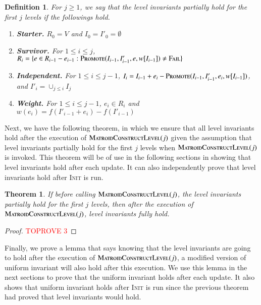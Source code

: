 \documentclass[11pt]{article}
\newtheorem{theorem}{Theorem}
\newtheorem{definition}{Definition}[section]
\newcommand{\err}{{\textsc{Fail}}}
\newcommand{\init}{\textsc{Init}}
\newcommand{\MatroidConstLevel}{\textsc{MatroidConstructLevel}}
\newcommand{\replacementTester}{\textsc{Promote}}
\begin{document}
\begin{tcolorbox}[width=\linewidth, colback=white!80!gray,boxrule=0pt,frame hidden, sharp corners]

\begin{definition}
    For $j \ge 1$, we say that 
    \emph{the level invariants partially hold for the first $j$ levels} if the followings hold.
    \begin{enumerate}
        \item \textbf{Starter.} $R_0 = V$ and $I_0 = I'_0 = \emptyset$
        \item \textbf{Survivor.}  For $1 \leq i \le j$, $R_i = \{ e \in R_{i-1} - e_{i-1}: \replacementTester{}(I_{i-1}, I'_{i-1}, e, w[I_{i-1}]) \ne \err\}$ 
        \item  \textbf{Independent.} For $1 \leq i \le j-1$, $I_i = I_{i-1} + e_i - \replacementTester{}(I_{i-1}, I'_{i-1}, e_i, w[I_{i-1}])$, and $I'_i = \cup_{j \le i} I_j$
        \item  \textbf{Weight.} For $1 \leq i \le j - 1$, $e_i \in R_i$ and  $w(e_i) = f(I'_{i-1} + e_i) - f(I'_{i-1})$
    \end{enumerate}
\end{definition}

\end{tcolorbox}


Next, we have the following theorem, in which we ensure that all level invariants hold after the execution of $\MatroidConstLevel{}(j)$ given the assumption that level invariants partially hold for the first $j$ levels when $\MatroidConstLevel{}(j)$ is invoked. 
This theorem will be of use in the following sections in showing that level invariants hold after each update. It can also independently prove that level invariants hold after \init{} is run.  


\begin{theorem}
    \label{thm:invariants:leveling}
If before calling $\MatroidConstLevel{}(j)$, the level invariants partially hold for the first $j$ levels,
then after the execution of $\MatroidConstLevel{}(j)$, level invariants fully hold.
\end{theorem}

\begin{proof}\textcolor{red}{TOPROVE 3}\end{proof}

Finally, we prove a lemma that says knowing that the level invariants are going to hold after the execution of $\MatroidConstLevel{}(j)$, 
a modified version of uniform invariant will also hold after this execution. We use this lemma in the next sections to prove that the uniform invariant holds after each update. It also shows that uniform invariant holds after \init{} is run since the previous theorem had proved that level invariants would hold. 
\end{document}
